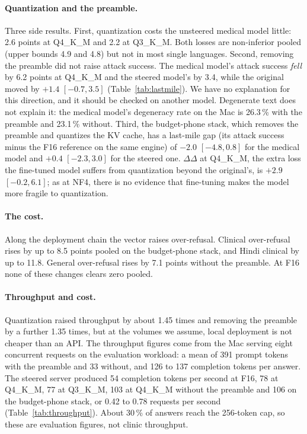 \paragraph{Quantization and the preamble.} Three side results. First, quantization costs the unsteered medical model little: 2.6 points at Q4\_K\_M and 2.2 at Q3\_K\_M. Both losses are non-inferior pooled (upper bounds 4.9 and 4.8) but not in most single languages. Second, removing the preamble did not raise attack success. The medical model's attack success \emph{fell} by 6.2 points at Q4\_K\_M and the steered model's by 3.4, while the original moved by $+1.4$ $[-0.7, 3.5]$ (Table~\ref{tab:lastmile}). We have no explanation for this direction, and it should be checked on another model. Degenerate text does not explain it: the medical model's degeneracy rate on the Mac is 26.3\,\% with the preamble and 23.1\,\% without. Third, the budget-phone stack, which removes the preamble and quantizes the KV cache, has a last-mile gap (its attack success minus the F16 reference on the same engine) of $-2.0$ $[-4.8, 0.8]$ for the medical model and $+0.4$ $[-2.3, 3.0]$ for the steered one. $\Delta\Delta$ at Q4\_K\_M, the extra loss the fine-tuned model suffers from quantization beyond the original's, is $+2.9$ $[-0.2, 6.1]$; as at NF4, there is no evidence that fine-tuning makes the model more fragile to quantization.


\paragraph{The cost.} Along the deployment chain the vector raises over-refusal. Clinical over-refusal rises by up to 8.5 points pooled on the budget-phone stack, and Hindi clinical by up to 11.8. General over-refusal rises by 7.1 points without the preamble. At F16 none of these changes clears zero pooled.

\paragraph{Throughput and cost.} Quantization raised throughput by about 1.45 times and removing the preamble by a further 1.35 times, but at the volumes we assume, local deployment is not cheaper than an API. The throughput figures come from the Mac serving eight concurrent requests on the evaluation workload: a mean of 391 prompt tokens with the preamble and 33 without, and 126 to 137 completion tokens per answer. The steered server produced 54 completion tokens per second at F16, 78 at Q4\_K\_M, 77 at Q3\_K\_M, 103 at Q4\_K\_M without the preamble and 106 on the budget-phone stack, or 0.42 to 0.78 requests per second (Table~\ref{tab:throughput}). About 30\,\% of answers reach the 256-token cap, so these are evaluation figures, not clinic throughput.


